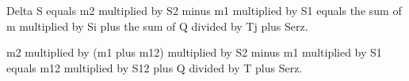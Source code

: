 Delta S equals m2 multiplied by S2 minus m1 multiplied by S1 equals the sum of m multiplied by Si plus the sum of Q divided by Tj plus Serz.  

m2 multiplied by (m1 plus m12) multiplied by S2 minus m1 multiplied by S1 equals m12 multiplied by S12 plus Q divided by T plus Serz.